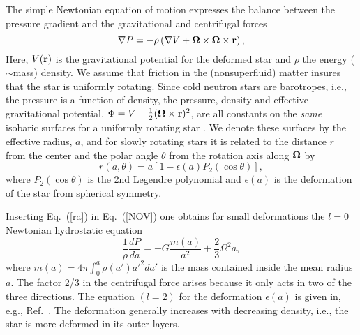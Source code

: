 \begin{multicols}{2}
The simple Newtonian equation of
motion expresses the balance between the pressure gradient and 
the gravitational and centrifugal forces
\begin{equation}
   \nabla P = -\rho\left( \nabla V +
        {\bf \Omega}\times{\bf \Omega}\times{\bf r} \right),
   \label{NOV}
\end{equation}
Here, $V({\bf r})$ is the gravitational potential for the deformed
star and $\rho$ the energy ($\sim$mass) density.  We assume that friction in the 
(nonsuperfluid) matter insures
that the star is uniformly rotating.  Since cold neutron stars are
barotropes, i.e., the pressure is a function of density,
the pressure, density and effective gravitational potential, 
$\Phi=V-\frac{1}{2}({\bf \Omega}\times{\bf r})^2$, are all
constants on the {\it same} isobaric surfaces
for a uniformly rotating star \cite{Hartle}.
We denote these surfaces by the effective radius, $a$, and
for slowly rotating stars it is related to the distance $r$ from the
center and the polar angle $\theta$ from the rotation axis along
${\bf\Omega}$ by \cite{Hartle}
\begin{equation}
   r(a,\theta) = a\left[ 1-\epsilon(a) P_2(\cos\theta) \right],
   \label{ra}
\end{equation}
where $P_2(\cos\theta)$ is the 2nd Legendre polynomial and
$\epsilon(a)$ is the deformation of the star from spherical symmetry.

Inserting Eq.\ (\ref{ra}) in Eq.\ (\ref{NOV}) 
one obtains for small deformations 
\cite{Hartle} the $l=0$ Newtonian hydrostatic equation
\begin{equation}
  \frac{1}{\rho}\frac{dP}{da} = -G\frac{m(a)}{a^2} + \frac{2}{3}\Omega^2 a,
  \label{Pa} 
\end{equation}
where $m(a)=4\pi\int^a_0\rho(a')a'^2da'$ is the mass
contained inside the mean radius $a$.
The factor 2/3 in the centrifugal force arises because it only acts in
two of the three directions.
The equation $(l=2)$ for the deformation $\epsilon(a)$
is given in, e.g., Ref.\ \cite{Tassoul}. 
The deformation generally increases
with decreasing density, i.e., the star is more deformed in its outer layers.


\end{multicols}
